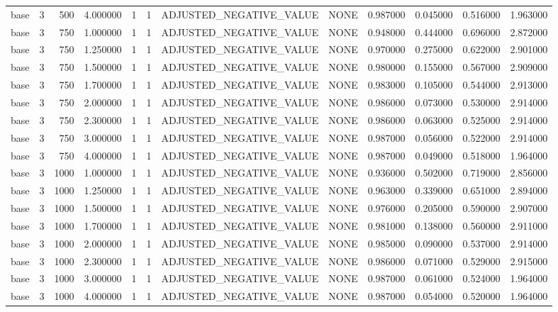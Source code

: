 \begin{tabular}{lrrrllllrrrr}
base & 3 & 500 & 4.000000 & 1 & 1 & ADJUSTED_NEGATIVE_VALUE & NONE & 0.987000 & 0.045000 & 0.516000 & 1.963000 \\
base & 3 & 750 & 1.000000 & 1 & 1 & ADJUSTED_NEGATIVE_VALUE & NONE & 0.948000 & 0.444000 & 0.696000 & 2.872000 \\
base & 3 & 750 & 1.250000 & 1 & 1 & ADJUSTED_NEGATIVE_VALUE & NONE & 0.970000 & 0.275000 & 0.622000 & 2.901000 \\
base & 3 & 750 & 1.500000 & 1 & 1 & ADJUSTED_NEGATIVE_VALUE & NONE & 0.980000 & 0.155000 & 0.567000 & 2.909000 \\
base & 3 & 750 & 1.700000 & 1 & 1 & ADJUSTED_NEGATIVE_VALUE & NONE & 0.983000 & 0.105000 & 0.544000 & 2.913000 \\
base & 3 & 750 & 2.000000 & 1 & 1 & ADJUSTED_NEGATIVE_VALUE & NONE & 0.986000 & 0.073000 & 0.530000 & 2.914000 \\
base & 3 & 750 & 2.300000 & 1 & 1 & ADJUSTED_NEGATIVE_VALUE & NONE & 0.986000 & 0.063000 & 0.525000 & 2.914000 \\
base & 3 & 750 & 3.000000 & 1 & 1 & ADJUSTED_NEGATIVE_VALUE & NONE & 0.987000 & 0.056000 & 0.522000 & 2.914000 \\
base & 3 & 750 & 4.000000 & 1 & 1 & ADJUSTED_NEGATIVE_VALUE & NONE & 0.987000 & 0.049000 & 0.518000 & 1.964000 \\
base & 3 & 1000 & 1.000000 & 1 & 1 & ADJUSTED_NEGATIVE_VALUE & NONE & 0.936000 & 0.502000 & 0.719000 & 2.856000 \\
base & 3 & 1000 & 1.250000 & 1 & 1 & ADJUSTED_NEGATIVE_VALUE & NONE & 0.963000 & 0.339000 & 0.651000 & 2.894000 \\
base & 3 & 1000 & 1.500000 & 1 & 1 & ADJUSTED_NEGATIVE_VALUE & NONE & 0.976000 & 0.205000 & 0.590000 & 2.907000 \\
base & 3 & 1000 & 1.700000 & 1 & 1 & ADJUSTED_NEGATIVE_VALUE & NONE & 0.981000 & 0.138000 & 0.560000 & 2.911000 \\
base & 3 & 1000 & 2.000000 & 1 & 1 & ADJUSTED_NEGATIVE_VALUE & NONE & 0.985000 & 0.090000 & 0.537000 & 2.914000 \\
base & 3 & 1000 & 2.300000 & 1 & 1 & ADJUSTED_NEGATIVE_VALUE & NONE & 0.986000 & 0.071000 & 0.529000 & 2.915000 \\
base & 3 & 1000 & 3.000000 & 1 & 1 & ADJUSTED_NEGATIVE_VALUE & NONE & 0.987000 & 0.061000 & 0.524000 & 1.964000 \\
base & 3 & 1000 & 4.000000 & 1 & 1 & ADJUSTED_NEGATIVE_VALUE & NONE & 0.987000 & 0.054000 & 0.520000 & 1.964000 \\

\end{tabular}

